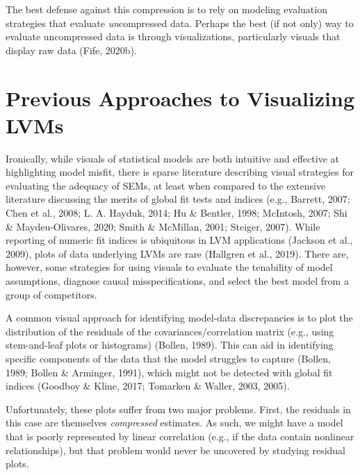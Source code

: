 \documentclass[
  english,
  doc]{apa6}
\begin{document}
The best defense against this compression is to rely on modeling evaluation strategies that evaluate \emph{un}compressed data. Perhaps the best (if not only) way to evaluate uncompressed data is through visualizations, particularly visuals that display raw data (Fife, 2020b).

\hypertarget{previous-approaches-to-visualizing-lvms}{%
\section{Previous Approaches to Visualizing LVMs}\label{previous-approaches-to-visualizing-lvms}}

Ironically, while visuals of statistical models are both intuitive and effective at highlighting model misfit, there is sparse literature describing visual strategies for evaluating the adequacy of SEMs, at least when compared to the extensive literature discussing the merits of global fit tests and indices (e.g., Barrett, 2007; Chen et al., 2008; L. A. Hayduk, 2014; Hu \& Bentler, 1998; McIntosh, 2007; Shi \& Maydeu-Olivares, 2020; Smith \& McMillan, 2001; Steiger, 2007). While reporting of numeric fit indices is ubiquitous in LVM applications (Jackson et al., 2009), plots of data underlying LVMs are rare (Hallgren et al., 2019). There are, however, some strategies for using visuals to evaluate the tenability of model assumptions, diagnose causal misspecifications, and select the best model from a group of competitors.

A common visual approach for identifying model-data discrepancies is to plot the distribution of the residuals of the covariances/correlation matrix (e.g., using stem-and-leaf plots or histograms) (Bollen, 1989). This can aid in identifying specific components of the data that the model struggles to capture (Bollen, 1989; Bollen \& Arminger, 1991), which might not be detected with global fit indices (Goodboy \& Kline, 2017; Tomarken \& Waller, 2003, 2005).

Unfortunately, these plots suffer from two major problems. First, the residuals in this case are themselves \emph{compressed} estimates. As such, we might have a model that is poorly represented by linear correlation (e.g., if the data contain nonlinear relationships), but that problem would never be uncovered by studying residual plots.
\end{document}
